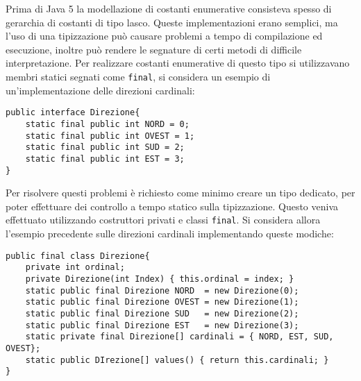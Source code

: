 \documentclass{article}
\numberwithin{equation}{subsection}
\begin{document}
Prima di Java 5 la modellazione di costanti enumerative consisteva spesso di gerarchia di costanti di tipo lasco. Queste implementazioni erano semplici, ma l'uso di una tipizzazione 
può causare problemi a tempo di compilazione ed esecuzione, inoltre può rendere le segnature di certi metodi di difficile interpretazione. 
Per realizzare costanti enumerative di questo tipo si utilizzavano membri statici segnati come \verb|final|, si considera un esempio di un'implementazione delle direzioni cardinali:
\begin{verbatim}
public interface Direzione{
    static final public int NORD = 0;
    static final public int OVEST = 1;
    static final public int SUD = 2;
    static final public int EST = 3;
}    
\end{verbatim}

Per risolvere questi problemi è richiesto come minimo creare un tipo dedicato, per poter effettuare dei controllo a tempo statico sulla tipizzazione. Questo veniva effettuato utilizzando costruttori 
privati e classi \verb|final|. Si considera allora l'esempio precedente sulle direzioni cardinali implementando queste modiche:
\begin{verbatim}
public final class Direzione{
    private int ordinal;
    private Direzione(int Index) { this.ordinal = index; }
    static public final Direzione NORD  = new Direzione(0);
    static public final Direzione OVEST = new Direzione(1);
    static public final Direzione SUD   = new Direzione(2);
    static public final Direzione EST   = new Direzione(3);
    static private final Direzione[] cardinali = { NORD, EST, SUD, OVEST};
    static public DIrezione[] values() { return this.cardinali; }
}   
\end{verbatim}
\end{document}
